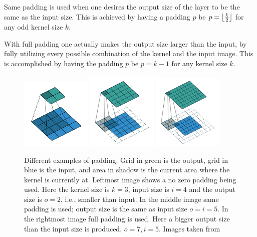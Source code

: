  Same padding is used when one desires the output size of the layer to be the same as the input size. This is achieved by having a padding $p$ be $ p = \left\lfloor \frac{k}{2} \right\rfloor $ for any odd kernel size $k$.
  
 With full padding one actually makes the output size larger than the input, by fully utilizing every possible combination of the kernel and the input image. This is accomplished  by having the padding $p $ be $p = k - 1$ for any kernel size $k$. 
 
 
 \begin{figure}[hbtp]
\begin{center}
\includegraphics[width = 0.3\textwidth]{./Images/noPad.png}
\includegraphics[width = 0.3\textwidth]{./Images/samePad.png}
\includegraphics[width = 0.3\textwidth]{./Images/fullPad.png} 
\caption{Different examples of padding. Grid in green is the output, grid in blue is the input, and area in shadow is the current area where the kernel is currently at. Leftmost image shows a no zero padding being used. Here the kernel size is $k = 3$, input size is $i = 4$ and the output size is  $o = 2$, i.e., smaller than input.  In the middle image same padding is used; output size is the same as input size $o = i = 5$. In the rightmost image full padding is used. Here a bigger output size than the input size is produced, $o = 7, i = 5$. Images taken from \cite{convArit}}
\label{fig:padding}
\end{center}
\end{figure}
 
